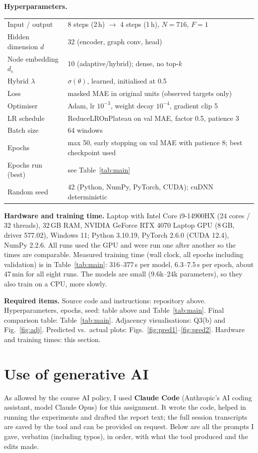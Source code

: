 \textbf{Hyperparameters.}
\begin{center}\small
\begin{tabular}{ll}\toprule
Input / output & 8 steps (2\,h) $\to$ 4 steps (1\,h), $N=716$, $F=1$\\
Hidden dimension $d$ & 32 (encoder, graph conv, head)\\
Node embedding $d_e$ & 10 (adaptive/hybrid); dense, no top-$k$\\
Hybrid $\lambda$ & $\sigma(\theta)$, learned, initialised at 0.5\\
Loss & masked MAE in original units (observed targets only)\\
Optimiser & Adam, lr $10^{-3}$, weight decay $10^{-4}$, gradient clip 5\\
LR schedule & ReduceLROnPlateau on val MAE, factor 0.5, patience 3\\
Batch size & 64 windows\\
Epochs & max 50, early stopping on val MAE with patience 8; best checkpoint used\\
Epochs run (best) & see Table~\ref{tab:main}\\
Random seed & 42 (Python, NumPy, PyTorch, CUDA); cuDNN deterministic\\\bottomrule
\end{tabular}
\end{center}

\textbf{Hardware and training time.} Laptop with Intel Core i9-14900HX (24 cores / 32 threads), 32\,GB RAM, NVIDIA GeForce RTX 4070
Laptop GPU (8\,GB, driver 577.02), Windows 11; Python 3.10.19, PyTorch 2.6.0 (CUDA 12.4), NumPy 2.2.6. All runs used the GPU and
were run one after another so the times are comparable. Measured training time (wall clock, all epochs including validation) is in
Table~\ref{tab:main}: 316--377\,s per model, 6.3--7.5\,s per epoch, about 47\,min for all eight runs. The models are small (9.6k--24k
parameters), so they also train on a CPU, more slowly.

\textbf{Required items.} Source code and instructions: repository above. Hyperparameters, epochs, seed: table above and Table~\ref{tab:main}.
Final comparison table: Table~\ref{tab:main}. Adjacency visualisations: Q3(b) and Fig.~\ref{fig:adj}. Predicted vs.\ actual plots:
Figs.~\ref{fig:pred1}--\ref{fig:pred2}. Hardware and training times: this section.

\section*{Use of generative AI}
As allowed by the course AI policy, I used \textbf{Claude Code} (Anthropic's AI coding assistant, model Claude Opus) for this assignment. It wrote the code, helped in running the experiments and drafted the report text;
the full session transcripts are saved by the tool and can be provided on request. Below are all the prompts I gave, verbatim
(including typos), in order, with what the tool produced and the edits made.


